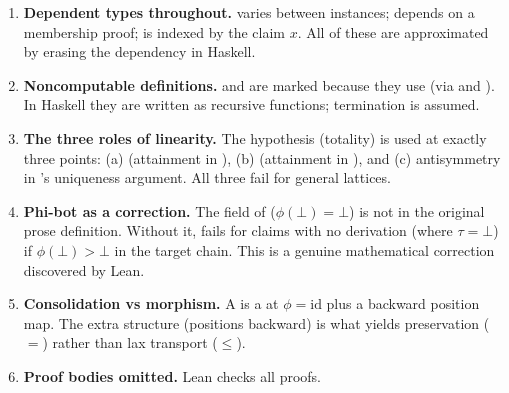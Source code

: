 \documentclass[11pt,a4paper]{article}
\begin{document}
\begin{enumerate}
\item \textbf{Dependent types throughout.}   varies between
  instances;  depends on a membership proof;
   is indexed by the claim $x$.  All of these are
  approximated by erasing the dependency in Haskell.

\item \textbf{Noncomputable definitions.}   and 
  are marked  because they use 
  (via  and ).  In Haskell they are
  written as recursive functions; termination is assumed.

\item \textbf{The three roles of linearity.}  The  hypothesis
  (totality) is used at exactly three points: (a) 
  (attainment in ), (b) 
  (attainment in ), and (c) antisymmetry in
  's uniqueness argument.  All three fail for
  general lattices.

\item \textbf{Phi-bot as a correction.}  The  field of
   ($\phi(\bot) = \bot$) is not in the original prose definition.
  Without it,  fails for claims with no derivation
  (where $\tau = \bot$) if $\phi(\bot) > \bot$ in the target chain.  This
  is a genuine mathematical correction discovered by Lean.

\item \textbf{Consolidation vs morphism.}  A  is a
   at $\phi = \mathrm{id}$ plus a backward position map.
  The extra structure (positions backward) is what yields preservation
  ($=$) rather than lax transport ($\le$).

\item \textbf{Proof bodies omitted.}  Lean checks all proofs.
\end{enumerate}
\end{document}
